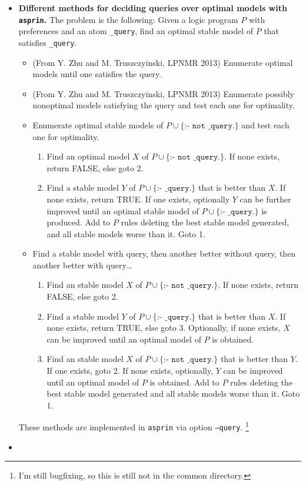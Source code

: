 \documentclass[a4paper,10pt]{article}
\begin{document}
\begin{itemize}
\item
\textbf{Different methods for deciding queries over optimal models with \texttt{asprin}.}
The problem is the following: Given a logic program $P$ with preferences and an atom \texttt{\_query}, 
find an optimal stable model of $P$ that satisfies \texttt{\_query}.
\begin{itemize}
    \item
    (From Y. Zhu and M. Truszczyinski, LPNMR 2013) Enumerate optimal models until one satisfies the query.
    \item
    (From Y. Zhu and M. Truszczyinski, LPNMR 2013) Enumerate possibly nonoptimal models satisfying the query and
    test each one for optimality.
    \item
    Enumerate optimal stable models of $P\cup\{\texttt{:- not \_query.}\}$ and 
    test each one for optimality.
    \begin{enumerate}
        \item
        Find an optimal model $X$ of $P\cup\{\texttt{:- not \_query.}\}$. If none exists, return FALSE, else goto 2.
        \item
        Find a stable model $Y$ of $P\cup\{\texttt{:- \_query.}\}$ that is better than $X$. 
        If none exists, return TRUE. 
        If one exists, optionally $Y$ can be further improved until 
        an optimal stable model of $P\cup\{\texttt{:- \_query.}\}$ is produced.
        Add to $P$ rules deleting the best stable model generated, and all stable models worse than it. 
        Goto 1.
    \end{enumerate}
    \item
    Find a stable model with query, 
    then another better without query, 
    then another better with query\ldots
    \begin{enumerate}
        \item
        Find an stable model $X$ of $P\cup\{\texttt{:- not \_query.}\}$. If none exists, return FALSE, else goto 2.
        \item
        Find a stable model $Y$ of $P\cup\{\texttt{:- \_query.}\}$ that is better than $X$. 
        If none exists, return TRUE, else goto 3.
        Optionally, if none exists, $X$ can be improved until an optimal model of $P$ is obtained.
        \item
        Find an stable model $X$ of $P\cup\{\texttt{:- not \_query.}\}$ that is better than $Y$. 
        If one exists, goto 2.
        If none exists, optionally, $Y$ can be improved until an optimal model of $P$ is obtained.
        Add to $P$ rules deleting the best stable model generated and all stable models worse than it.
        Goto 1.
    \end{enumerate}
\end{itemize}
These methods are implemented in \texttt{asprin} via option \texttt{--query}.
\footnote{I'm still bugfixing, so this is still not in the common directory.}
\item


\end{itemize}
\end{document}
